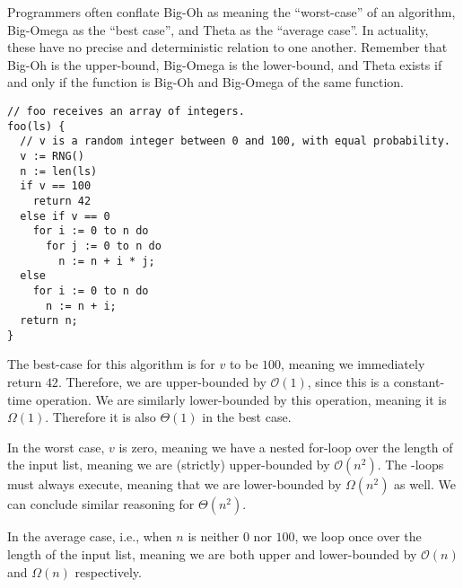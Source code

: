 Programmers often conflate Big-Oh as meaning the ``worst-case'' of an algorithm, Big-Omega as the ``best case'', and Theta as the ``average case''. In actuality, these have no precise and deterministic relation to one another. Remember that Big-Oh is the upper-bound, Big-Omega is the lower-bound, and Theta exists if and only if the function is Big-Oh and Big-Omega of the same function.

\par{
\begin{verbatim}
// foo receives an array of integers.
foo(ls) {
  // v is a random integer between 0 and 100, with equal probability.
  v := RNG()
  n := len(ls)
  if v == 100
    return 42
  else if v == 0
    for i := 0 to n do
      for j := 0 to n do
        n := n + i * j;
  else
    for i := 0 to n do
      n := n + i;
  return n;
}
\end{verbatim}
}

The best-case for this algorithm is for $v$ to be $100$, meaning we immediately return $42$. Therefore, we are upper-bounded by $\mathcal{O}(1)$, since this is a constant-time operation. We are similarly lower-bounded by this operation, meaning it is $\Omega{(1)}$. Therefore it is also $\Theta(1)$ in the best case.

In the worst case, $v$ is zero, meaning we have a nested for-loop over the length of the input list, meaning we are (strictly) upper-bounded by $\mathcal{O}(n^2)$. The -loops must always execute, meaning that we are lower-bounded by $\Omega(n^2)$ as well. We can conclude similar reasoning for $\Theta(n^2)$.

In the average case, i.e., when $n$ is neither $0$ nor $100$, we loop once over the length of the input list, meaning we are both upper and lower-bounded by $\mathcal{O}(n)$ and $\Omega(n)$ respectively.


